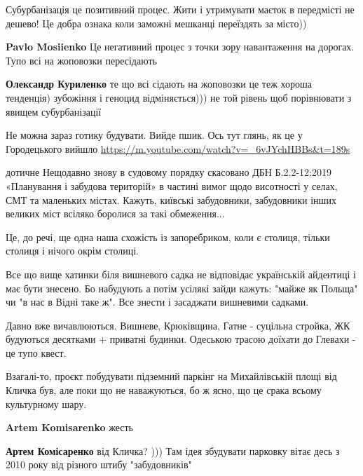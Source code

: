 \begin{itemize}

Субурбанізація це позитивний процес. Жити і утримувати маєток в передмісті не
дешево! Це добра ознака коли заможні мешканці переїздять за місто))

\begin{itemize} %
\textbf{Pavlo Mosiienko} Це негативний процес з точки зору навантаження на дорогах. Тупо всі на жоповозки пересідають

\textbf{Олександр Куриленко} те що всі сідають на жоповозки це теж хороша тенденція) зубожіння і геноцид відміняється))) не той рівень щоб порівнювати з явищем субурбанізації
\end{itemize} %


Не можна зараз готику будувати. Вийде пшик. Ось тут глянь, як це у Городецького
вийшло \url{https://m.youtube.com/watch?v=_6vJYchHBBs&t=189s}


дотичне
Нещодавно знову в судовому порядку скасовано ДБН Б.2.2-12:2019 «Планування і забудова територій» в частині вимог щодо висотності у селах, СМТ та маленьких містах.
Кажуть, київські забудовники, забудовники інших великих міст всіляко боролися за такі обмеження...

Це, до речі, ще одна наша схожість із запоребриком, коли є столиця, тільки столиця і нічого окрім столиці.

Все що вище хатинки біля вишневого садка не відповідає українській айдентиці і має бути знесено. Бо набудують а потім усілякі зайди кажуть: "майже як Польща" чи "в нас в Відні таке ж". Все знести і засаджати вишневими садками.

Давно вже вичавлюються. Вишневе, Крюківщина, Гатне - суцільна стройка, ЖК будуються десятками + приватні будинки. Одеською трасою доїхати до Глевахи - це тупо квест.

Взагалі-то, проєкт побудувати підземний паркінг на Михайлівській площі від Кличка був, але поки що не наважуються, бо ж ясно, що це срака всьому культурному шару.

\begin{itemize} %

\textbf{Artem Komisarenko} жесть

\textbf{Артем Комісаренко} від Кличка? ))) Там ідея збудувати парковку вітає десь з 2010 року від різного штибу "забудовників"


\end{itemize}
\end{itemize}
